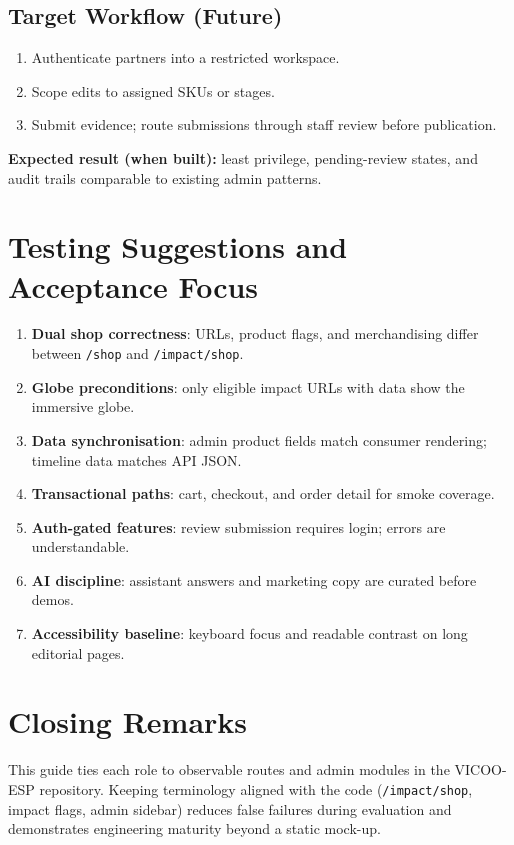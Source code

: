\documentclass[11pt]{article}
\newcommand{\projectname}{VICOO-ESP}
\begin{document}
\subsection{Target Workflow (Future)}
\begin{enumerate}[leftmargin=2.2em]
    \item Authenticate partners into a restricted workspace.
    \item Scope edits to assigned SKUs or stages.
    \item Submit evidence; route submissions through staff review before publication.
\end{enumerate}

\textbf{Expected result (when built):} least privilege, pending-review states, and audit trails comparable to existing admin patterns.

\section{Testing Suggestions and Acceptance Focus}
\begin{enumerate}[leftmargin=2.2em]
    \item \textbf{Dual shop correctness}: URLs, product flags, and merchandising differ between \texttt{/shop} and \texttt{/impact/shop}.
    \item \textbf{Globe preconditions}: only eligible impact URLs with data show the immersive globe.
    \item \textbf{Data synchronisation}: admin product fields match consumer rendering; timeline data matches API JSON.
    \item \textbf{Transactional paths}: cart, checkout, and order detail for smoke coverage.
    \item \textbf{Auth-gated features}: review submission requires login; errors are understandable.
    \item \textbf{AI discipline}: assistant answers and marketing copy are curated before demos.
    \item \textbf{Accessibility baseline}: keyboard focus and readable contrast on long editorial pages.
\end{enumerate}

\section{Closing Remarks}
This guide ties each role to observable routes and admin modules in the \projectname{} repository. Keeping terminology aligned with the code (\texttt{/impact/shop}, impact flags, admin sidebar) reduces false failures during evaluation and demonstrates engineering maturity beyond a static mock-up.
\end{document}
